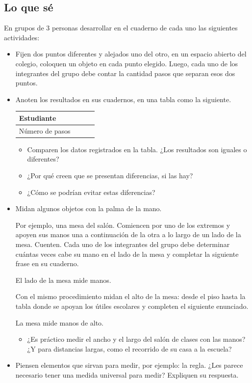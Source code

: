 \documentclass[letterpaper,11pt,twoside]{article}
\begin{document}
\begin{multicols}{2}
\section*{Lo que s\'{e}}
En grupos de 3 personas desarrollar en el cuaderno de cada uno las siguientes actividades:
\begin{itemize}
\item Fijen dos puntos diferentes y alejados uno del otro, en un
espacio abierto del colegio, coloquen un objeto en cada punto
elegido. Luego, cada uno de los integrantes del grupo debe
contar la cantidad pasos que separan esos dos puntos.
\item Anoten los resultados en sus cuadernos, en una tabla como la siguiente.
\begin{center}
\begin{tabular}{|l|p{1.4cm}|p{1.4cm}|p{1.4cm}|}
\hline 
Estudiante &  &  &  \\ 
\hline 
Número de pasos &  &  &  \\ 
\hline 
\end{tabular} 
\end{center}
\begin{itemize}
\item Comparen los datos registrados en la tabla. ¿Los resultados son iguales o diferentes?
\item ¿Por qué creen que se presentan diferencias, si las hay?
\item ¿Cómo se podrían evitar estas diferencias?
\end{itemize}
\item Midan algunos objetos con la palma de la mano.

Por ejemplo, una mesa del salón. Comiencen por uno de los
extremos y apoyen sus manos una a continuación de la otra a
lo largo de un lado de la mesa. Cuenten.
Cada uno de los integrantes del grupo debe determinar
cuántas veces cabe su mano en el lado de la mesa y completar
la siguiente frase en su cuaderno.

El lado de la mesa mide \underline{\hspace*{24pt}} manos.

Con el mismo procedimiento midan el alto de la mesa: desde
el piso hasta la tabla donde se apoyan los útiles escolares y
completen el siguiente enunciado.

La mesa mide \underline{\hspace*{24pt}} manos de alto.
\begin{itemize}
\item ¿Es práctico medir el ancho y el largo del salón de clases con las manos? ¿Y para distancias largas, como el recorrido de su casa a la escuela?
\end{itemize}
\item Piensen elementos que sirvan para medir, por ejemplo: la
regla. ¿Les parece necesario tener una medida universal para
medir? Expliquen su respuesta.
\end{itemize}

\end{multicols}
\end{document}
